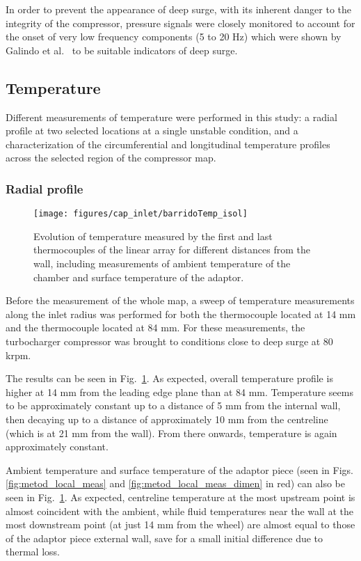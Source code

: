 In order to prevent the appearance of deep surge, with its inherent danger to the integrity of the compressor, pressure signals were closely monitored to account for the onset of very low frequency components (5 to 20 Hz) which were shown by Galindo et al.~\cite{galindo2013engine} to be suitable indicators of deep surge.

\subsection{Temperature}
\label{sub:temperature}

Different measurements of temperature were performed in this study: a radial profile at two selected locations at a single unstable condition, and a characterization of the circumferential and longitudinal temperature profiles across the selected region of the compressor map.

\subsubsection{Radial profile}

\begin{figure}[b!]
\centering
\texttt{[image: figures/cap\_inlet/barridoTemp\_isol]}
\caption[Radial temperature distributions]{Evolution of temperature measured by the first and last thermocouples of the linear array for different distances from the wall, including measurements of ambient temperature of the chamber and surface temperature of the adaptor.}
\label{fig:barrido_temp}
\end{figure}

Before the measurement of the whole map, a sweep of temperature measurements along the inlet radius was performed for both the thermocouple located at 14 mm and the thermocouple located at 84 mm. For these measurements, the turbocharger compressor was brought to conditions close to deep surge at 80 krpm.

The results can be seen in Fig.~\ref{fig:barrido_temp}. As expected, overall temperature profile is higher at 14 mm from the leading edge plane than at 84 mm. Temperature seems to be approximately constant up to a distance of 5 mm from the internal wall, then decaying up to a distance of approximately 10 mm from the centreline (which is at 21 mm from the wall). From there onwards, temperature is again approximately constant.

Ambient temperature and surface temperature of the adaptor piece (seen in Figs. \ref{fig:metod_local_meas} and \ref{fig:metod_local_meas_dimen} in red) can also be seen in Fig.~\ref{fig:barrido_temp}. As expected, centreline temperature at the most upstream point is almost coincident with the ambient, while fluid temperatures near the wall at the most downstream point (at just 14 mm from the wheel) are almost equal to those of the adaptor piece external wall, save for a small initial difference due to thermal loss.

